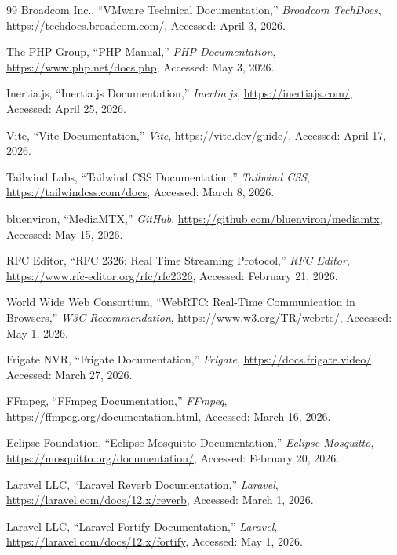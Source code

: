 \begin{thebibliography}{99}
Broadcom Inc., ``VMware Technical Documentation,'' \textit{Broadcom TechDocs}, \url{https://techdocs.broadcom.com/}, Accessed: April 3, 2026.

The PHP Group, ``PHP Manual,'' \textit{PHP Documentation}, \url{https://www.php.net/docs.php}, Accessed: May 3, 2026.

Inertia.js, ``Inertia.js Documentation,'' \textit{Inertia.js}, \url{https://inertiajs.com/}, Accessed: April 25, 2026.

Vite, ``Vite Documentation,'' \textit{Vite}, \url{https://vite.dev/guide/}, Accessed: April 17, 2026.

Tailwind Labs, ``Tailwind CSS Documentation,'' \textit{Tailwind CSS}, \url{https://tailwindcss.com/docs}, Accessed: March 8, 2026.

bluenviron, ``MediaMTX,'' \textit{GitHub}, \url{https://github.com/bluenviron/mediamtx}, Accessed: May 15, 2026.

RFC Editor, ``RFC 2326: Real Time Streaming Protocol,'' \textit{RFC Editor}, \url{https://www.rfc-editor.org/rfc/rfc2326}, Accessed: February 21, 2026.

World Wide Web Consortium, ``WebRTC: Real-Time Communication in Browsers,'' \textit{W3C Recommendation}, \url{https://www.w3.org/TR/webrtc/}, Accessed: May 1, 2026.

Frigate NVR, ``Frigate Documentation,'' \textit{Frigate}, \url{https://docs.frigate.video/}, Accessed: March 27, 2026.

FFmpeg, ``FFmpeg Documentation,'' \textit{FFmpeg}, \url{https://ffmpeg.org/documentation.html}, Accessed: March 16, 2026.

Eclipse Foundation, ``Eclipse Mosquitto Documentation,'' \textit{Eclipse Mosquitto}, \url{https://mosquitto.org/documentation/}, Accessed: February 20, 2026.

Laravel LLC, ``Laravel Reverb Documentation,'' \textit{Laravel}, \url{https://laravel.com/docs/12.x/reverb}, Accessed: March 1, 2026.

Laravel LLC, ``Laravel Fortify Documentation,'' \textit{Laravel}, \url{https://laravel.com/docs/12.x/fortify}, Accessed: May 1, 2026.


\end{thebibliography}
